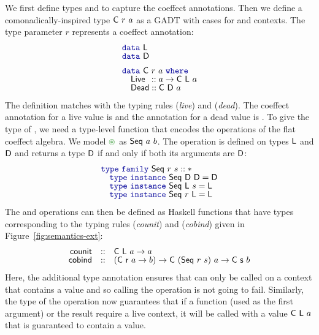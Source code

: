 We first define types  and  to capture the coeffect annotations. 
Then we define a comonadically-inspired type $\textnormal{\sffamily C}~r~a$ as a GADT with cases for
 and  contexts. The type parameter $r$ represents a coeffect 
annotation:
%
\begin{equation*}
\begin{array}{l}
\kvd{data}~\ident{L} \\[-0.2em]
\kvd{data}~\ident{D} \\[0.5em]
\kvd{data}~\ident{C}~r~a~\kvd{where} \\[-0.2em]
\quad \ident{Live} \hspace{0.45em}:: a \rightarrow \ident{C}~\ident{L}~a\\[-0.2em]
\quad \ident{Dead} :: \ident{C}~\ident{D}~a
\end{array}
\end{equation*}
%
The definition matches with the typing rules (\emph{live}) and (\emph{dead}). The coeffect 
annotation for a live value is  and the annotation for a dead value is .
To give the type of , we need a type-level function that encodes the operations
of the flat coeffect algebra. We model $\cseq$ as $\textnormal{\sffamily Seq}~a~b$. The operation is defined
on types $\textnormal{\sffamily L}$ and $\textnormal{\sffamily D}$ and returns a type $\textnormal{\sffamily D}$ if and only if both its
arguments are $\textnormal{\sffamily D}$:
%
\begin{equation*}
\begin{array}{l}
\kvd{type}~\kvd{family}~\ident{Seq}~r~s :: *\\[-0.2em]
\quad \kvd{type}~\kvd{instance}~\ident{Seq}~\ident{D}~\ident{D} = \ident{D}\\[-0.2em]
\quad \kvd{type}~\kvd{instance}~\ident{Seq}~\ident{L}~s = \ident{L}\\[-0.2em]
\quad \kvd{type}~\kvd{instance}~\ident{Seq}~r~\ident{L} = \ident{L}
\end{array}
\end{equation*}
%
The  and  operations can then be defined as Haskell functions
that have types corresponding to the typing rules (\emph{counit}) and (\emph{cobind}) given
in Figure~\ref{fig:semantics-ext}:
%
\begin{equation*}
\begin{array}{rcl}
\textnormal{\sffamily counit} &::& \textnormal{\sffamily C}~\textnormal{\sffamily L}~a \rightarrow a \\[-0.2em]
\textnormal{\sffamily cobind} &::& (\textnormal{\sffamily C}~\textnormal{\sffamily r}~a \rightarrow b) \rightarrow \textnormal{\sffamily C}~(\textnormal{\sffamily Seq}~r~s)~a \rightarrow \textnormal{\sffamily C}~\textnormal{\sffamily s}~b
\end{array}
\end{equation*}
%
Here, the additional type annotation ensures that  can only be called on a context
that contains a value and so calling the operation is not going to fail. Similarly, the type of the
 operation now guarantees that if a function (used as the first argument) or the result
require a live context, it will be called with a value $\textnormal{\sffamily C}~\textnormal{\sffamily L}~a$ that is guaranteed
to contain a value. 

